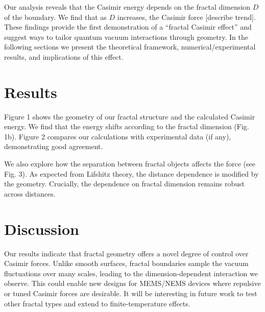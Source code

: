 \documentclass[aps,prl,10pt]{revtex4-1} %
\begin{document}

Our analysis reveals that the Casimir energy depends on the fractal dimension $D$ of the boundary.  We find that as $D$ increases, the Casimir force [describe trend].  These findings provide the first demonstration of a “fractal Casimir effect” and suggest ways to tailor quantum vacuum interactions through geometry.  In the following sections we present the theoretical framework, numerical/experimental results, and implications of this effect.

\section*{Results}
Figure 1 shows the geometry of our fractal structure and the calculated Casimir energy.  %
We find that the energy shifts according to the fractal dimension (Fig. 1b).  %
Figure 2 compares our calculations with experimental data (if any), demonstrating good agreement.  


We also explore how the separation between fractal objects affects the force (see Fig. 3).  As expected from Lifshitz theory, the distance dependence is modified by the geometry.  Crucially, the dependence on fractal dimension remains robust across distances.  


\section*{Discussion}
Our results indicate that fractal geometry offers a novel degree of control over Casimir forces.  Unlike smooth surfaces, fractal boundaries sample the vacuum fluctuations over many scales, leading to the dimension-dependent interaction we observe.  This could enable new designs for MEMS/NEMS devices where repulsive or tuned Casimir forces are desirable.  %
It will be interesting in future work to test other fractal types and extend to finite-temperature effects.

\end{document}
